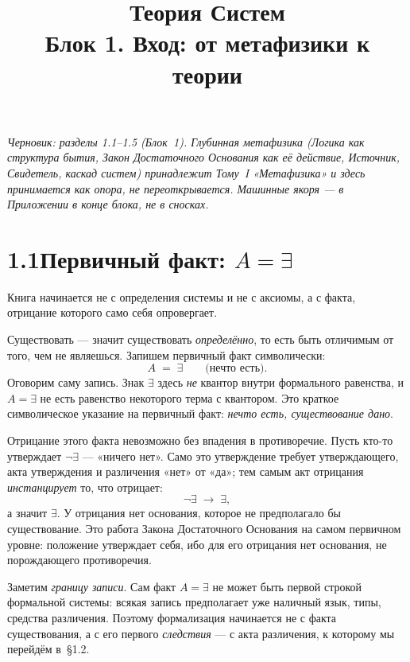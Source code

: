 \documentclass[12pt,a4paper]{article}
\title{\textbf{Теория Систем}\\[2mm]\large Блок 1. Вход: от метафизики к теории}
\author{}
\date{}
\begin{document}
\maketitle
\thispagestyle{empty}

\noindent\small\textit{Черновик: разделы 1.1--1.5 (Блок~1). Глубинная метафизика (Логика как
структура бытия, Закон Достаточного Основания как её действие, Источник, Свидетель,
каскад систем) принадлежит Тому~I «Метафизика» и здесь принимается как опора, не
переоткрывается. Машинные якоря — в Приложении в конце блока, не в сносках.}\normalsize

\bigskip

\section*{1.1\quad Первичный факт: $A=\exists$}

Книга начинается не с определения системы и не с аксиомы, а с факта, отрицание
которого само себя опровергает.

Существовать --- значит существовать \emph{определённо}, то есть быть отличимым от
того, чем не являешься. Запишем первичный факт символически:
\[
  A \;=\; \exists \qquad\text{(нечто есть).}
\]
Оговорим саму запись. Знак $\exists$ здесь \emph{не} квантор внутри формального
равенства, и $A=\exists$ не есть равенство некоторого терма с квантором. Это краткое
символическое указание на первичный факт: \emph{нечто есть, существование дано}.

Отрицание этого факта невозможно без впадения в противоречие. Пусть кто-то
утверждает $\neg\exists$ --- «ничего нет». Само это утверждение требует утверждающего,
акта утверждения и различения «нет» от «да»; тем самым акт отрицания
\emph{инстанцирует} то, что отрицает:
\[
  \neg\exists \;\rightarrow\; \exists,
\]
а значит $\exists$. У отрицания нет основания, которое не предполагало бы
существование. Это работа Закона Достаточного Основания на самом первичном уровне:
положение утверждает себя, ибо для его отрицания нет основания, не порождающего
противоречия.

Заметим \emph{границу записи}. Сам факт $A=\exists$ не может быть первой строкой
формальной системы: всякая запись предполагает уже наличный язык, типы, средства
различения. Поэтому формализация начинается не с факта существования, а с его первого
\emph{следствия} --- с акта различения, к которому мы перейдём в~§1.2.
\end{document}
